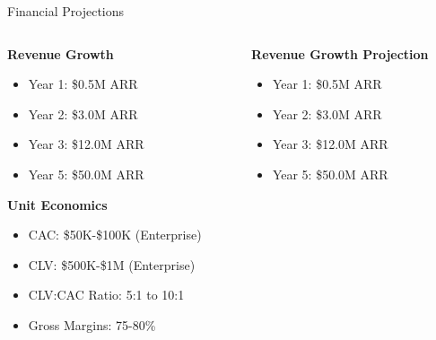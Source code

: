 \documentclass[aspectratio=169]{beamer}
\begin{document}
\begin{frame}{Financial Projections}
    \begin{columns}
        \begin{column}{0.5\textwidth}
            \textbf{Revenue Growth}
            \begin{itemize}
                \item Year 1: \$0.5M ARR
                \item Year 2: \$3.0M ARR
                \item Year 3: \$12.0M ARR
                \item Year 5: \$50.0M ARR
            \end{itemize}
            
            \vspace{0.5cm}
            \textbf{Unit Economics}
            \begin{itemize}
                \item CAC: \$50K-\$100K (Enterprise)
                \item CLV: \$500K-\$1M (Enterprise)
                \item CLV:CAC Ratio: 5:1 to 10:1
                \item Gross Margins: 75-80\%
            \end{itemize}
        \end{column}
        \begin{column}{0.5\textwidth}
            \begin{center}
                \textbf{Revenue Growth Projection}
                \vspace{0.5cm}
                \begin{itemize}
                    \item Year 1: \$0.5M ARR
                    \item Year 2: \$3.0M ARR
                    \item Year 3: \$12.0M ARR
                    \item Year 5: \$50.0M ARR
                \end{itemize}
            \end{center}
        \end{column}
    \end{columns}
\end{frame}
\end{document}
